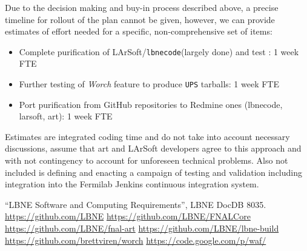 \documentclass[usletter]{article}
\newcommand{\code}[1]{\texttt{#1}}
\newcommand{\worch}{\textit{Worch}\xspace}
\newcommand{\ups}{\code{UPS}\xspace}
\newcommand{\art}{art\xspace}
\newcommand{\larsoft}{LArSoft\xspace}
\newcommand{\lbnecode}{\code{lbnecode}\xspace}
\begin{document}
Due to the decision making and buy-in process described above, a
precise timeline for rollout of the plan cannot be given, however, we can provide  estimates
of effort needed for a specific, non-comprehensive set of items:
\begin{itemize}
\item Complete purification of \larsoft/\lbnecode (largely done) and test : 1 week FTE
\item Further testing of \worch feature to produce \ups tarballs:  1 week FTE
\item Port purification from GitHub repositories to Redmine ones
  (lbnecode, larsoft, art): 1 week FTE
\end{itemize}

Estimates are integrated coding time and do not take into account
necessary discussions, assume that \art and \larsoft developers agree
to this approach and with not contingency to account for unforeseen
technical problems.  Also not included is defining and enacting a
campaign of testing and validation including integration into the
Fermilab Jenkins continuous integration system.

\begin{thebibliography}{99}
 ``LBNE Software and Computing Requirements'', LBNE DocDB 8035.
 \url{https://github.com/LBNE}
 \url{https://github.com/LBNE/FNALCore}
 \url{https://github.com/LBNE/fnal-art}
 \url{https://github.com/LBNE/lbne-build}
 \url{https://github.com/brettviren/worch}
 \url{https://code.google.com/p/waf/}
\end{thebibliography}
\end{document}
